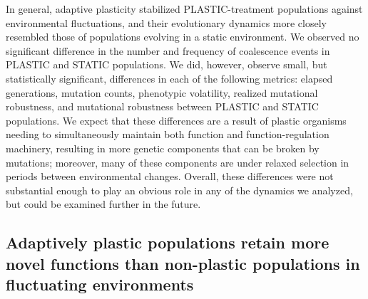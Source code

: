 \documentclass[utf8]{frontiersSCNS} %
\begin{document}
\begin{raggedbottom}
In general, adaptive plasticity stabilized PLASTIC-treatment populations against environmental fluctuations, and their evolutionary dynamics more closely resembled those of populations evolving in a static environment.
We observed no significant difference in the number and frequency of coalescence events in PLASTIC and STATIC populations.
We did, however, observe small, but statistically significant, differences in each of the following metrics: elapsed generations,  mutation counts, phenotypic volatility, realized mutational robustness, and mutational robustness between PLASTIC and STATIC populations.  
We expect that these differences are a result of plastic organisms needing to simultaneously maintain both function and function-regulation machinery, resulting in more genetic components that can be broken by mutations; moreover, many of these components are under relaxed selection in periods between environmental changes.
Overall, these differences were not substantial enough to play an obvious role in any of the dynamics we analyzed, but could be examined further in the future.

\subsection{Adaptively plastic populations retain more novel functions than non-plastic populations in fluctuating environments}




\end{raggedbottom}
\end{document}
